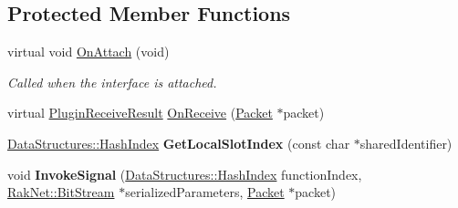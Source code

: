 \subsection*{Protected Member Functions}
\begin{DoxyCompactItemize}
\item 
\hypertarget{class_rak_net_1_1_r_p_c4_a9ca07d17100a98cb05037ee496745e62}{virtual void \hyperlink{class_rak_net_1_1_r_p_c4_a9ca07d17100a98cb05037ee496745e62}{On\-Attach} (void)}\label{class_rak_net_1_1_r_p_c4_a9ca07d17100a98cb05037ee496745e62}

\begin{DoxyCompactList}\small\item\em Called when the interface is attached. \end{DoxyCompactList}\item 
virtual \hyperlink{group___p_l_u_g_i_n___i_n_t_e_r_f_a_c_e___g_r_o_u_p_ga89998adaafb29e5d879113b992161085}{Plugin\-Receive\-Result} \hyperlink{class_rak_net_1_1_r_p_c4_aa2df727ed0ef203a017e198a94dc8841}{On\-Receive} (\hyperlink{struct_rak_net_1_1_packet}{Packet} $\ast$packet)
\item 
\hypertarget{class_rak_net_1_1_r_p_c4_acac03514c54131dcc7e51fd0db215fcd}{\hyperlink{struct_data_structures_1_1_hash_index}{Data\-Structures\-::\-Hash\-Index} {\bfseries Get\-Local\-Slot\-Index} (const char $\ast$shared\-Identifier)}\label{class_rak_net_1_1_r_p_c4_acac03514c54131dcc7e51fd0db215fcd}

\item 
\hypertarget{class_rak_net_1_1_r_p_c4_a2c59292c2690b7c27d0e450e83a95e0c}{void {\bfseries Invoke\-Signal} (\hyperlink{struct_data_structures_1_1_hash_index}{Data\-Structures\-::\-Hash\-Index} function\-Index, \hyperlink{class_rak_net_1_1_bit_stream}{Rak\-Net\-::\-Bit\-Stream} $\ast$serialized\-Parameters, \hyperlink{struct_rak_net_1_1_packet}{Packet} $\ast$packet)}\label{class_rak_net_1_1_r_p_c4_a2c59292c2690b7c27d0e450e83a95e0c}

\end{DoxyCompactItemize}
